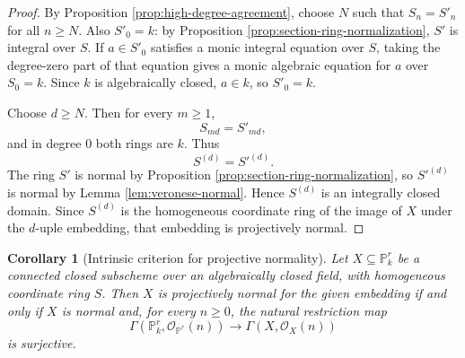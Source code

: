 \documentclass[11pt]{amsart}
\newcommand{\OO}{\mathcal O}
\theoremstyle{plain}
\newtheorem{corollary}[theorem]{Corollary}
\theoremstyle{definition}
\theoremstyle{remark}
\begin{document}
\begin{proof}
By Proposition \ref{prop:high-degree-agreement}, choose $N$ such that $S_n=S'_n$ for all $n\geq N$.  Also $S'_0=k$: by Proposition \ref{prop:section-ring-normalization}, $S'$ is integral over $S$.  If $a\in S'_0$ satisfies a monic integral equation over $S$, taking the degree-zero part of that equation gives a monic algebraic equation for $a$ over $S_0=k$.  Since $k$ is algebraically closed, $a\in k$, so $S'_0=k$.

Choose $d\geq N$.  Then for every $m\geq 1$,
\[
  S_{md} = S'_{md},
\]
and in degree $0$ both rings are $k$.  Thus
\[
  S^{(d)} = S'^{(d)}.
\]
The ring $S'$ is normal by Proposition \ref{prop:section-ring-normalization}, so $S'^{(d)}$ is normal by Lemma \ref{lem:veronese-normal}.  Hence $S^{(d)}$ is an integrally closed domain.  Since $S^{(d)}$ is the homogeneous coordinate ring of the image of $X$ under the $d$-uple embedding, that embedding is projectively normal.
\end{proof}

\begin{corollary}[Intrinsic criterion for projective normality]\label{cor:projective-normality-criterion}
Let $X\subseteq \mathbb P^r_k$ be a connected closed subscheme over an algebraically closed field, with homogeneous coordinate ring $S$.  Then $X$ is projectively normal for the given embedding if and only if $X$ is normal and, for every $n\geq 0$, the natural restriction map
\[
  \Gamma(\mathbb P^r_k,\OO_{\mathbb P^r}(n))
  \longrightarrow
  \Gamma(X,\OO_X(n))
\]
is surjective.
\end{corollary}
\end{document}
